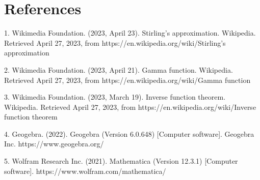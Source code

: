 \documentclass{article}
\begin{document}
        \section{References}
        1. Wikimedia Foundation. (2023, April 23). Stirling's approximation. Wikipedia. Retrieved April 27, 2023, from https://en.wikipedia.org/wiki/Stirling's approximation
        
        2. Wikimedia Foundation. (2023, April 21). Gamma function. Wikipedia. Retrieved April 27, 2023, from https://en.wikipedia.org/wiki/Gamma function
        
        3. Wikimedia Foundation. (2023, March 19). Inverse function theorem. Wikipedia. Retrieved April 27, 2023, from https://en.wikipedia.org/wiki/Inverse function theorem

        4. Geogebra. (2022). Geogebra (Version 6.0.648) [Computer software]. Geogebra Inc. https://www.geogebra.org/

        5. Wolfram Research Inc. (2021). Mathematica (Version 12.3.1) [Computer software]. https://www.wolfram.com/mathematica/
        
\end{document}

